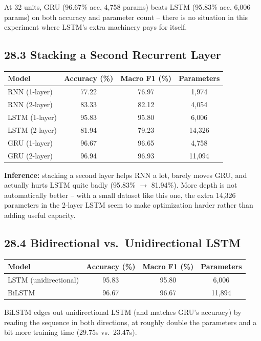 \documentclass[10pt]{article}
\begin{document}
At 32 units, GRU (96.67\% acc, 4,758 params) beats LSTM (95.83\% acc, 6,006
params) on both accuracy and parameter count -- there is no situation in this
experiment where LSTM's extra machinery pays for itself.

\subsection*{28.3 Stacking a Second Recurrent Layer}

\begin{center}
\begin{tabular}{|l|c|c|c|}
\hline
Model & Accuracy (\%) & Macro F1 (\%) & Parameters\\
\hline
RNN (1-layer) & 77.22 & 76.97 & 1,974\\
RNN (2-layer) & 83.33 & 82.12 & 4,054\\
LSTM (1-layer) & 95.83 & 95.80 & 6,006\\
LSTM (2-layer) & 81.94 & 79.23 & 14,326\\
GRU (1-layer) & 96.67 & 96.65 & 4,758\\
GRU (2-layer) & 96.94 & 96.93 & 11,094\\
\hline
\end{tabular}
\end{center}

\textbf{Inference:} stacking a second layer helps RNN a lot, barely moves
GRU, and actually hurts LSTM quite badly (95.83\% $\to$ 81.94\%). More depth
is not automatically better -- with a small dataset like this one, the extra
14,326 parameters in the 2-layer LSTM seem to make optimization harder rather
than adding useful capacity.

\subsection*{28.4 Bidirectional vs.\ Unidirectional LSTM}

\begin{center}
\begin{tabular}{|l|c|c|c|}
\hline
Model & Accuracy (\%) & Macro F1 (\%) & Parameters\\
\hline
LSTM (unidirectional) & 95.83 & 95.80 & 6,006\\
BiLSTM & 96.67 & 96.67 & 11,894\\
\hline
\end{tabular}
\end{center}

BiLSTM edges out unidirectional LSTM (and matches GRU's accuracy) by reading
the sequence in both directions, at roughly double the parameters and a bit
more training time (29.75s vs.\ 23.47s).
\end{document}
